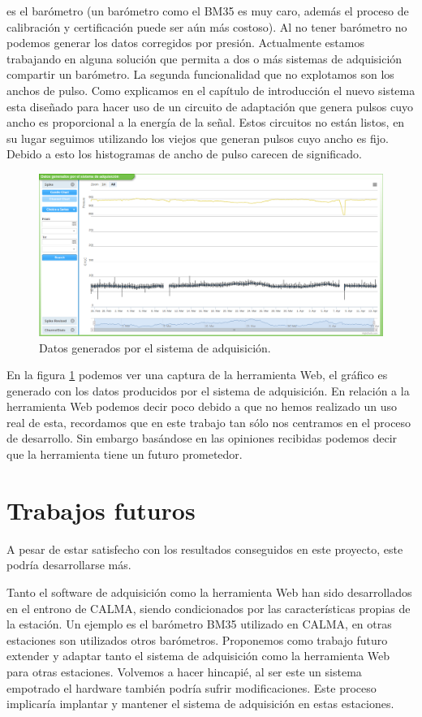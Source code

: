 	es el barómetro (un barómetro como el BM35 es muy caro, además el proceso de calibración y certificación puede ser aún más costoso). Al no
	tener barómetro no podemos generar los datos corregidos por presión. Actualmente estamos trabajando en alguna solución que permita a dos o más
	sistemas de adquisición compartir un barómetro. La segunda funcionalidad que no explotamos son los anchos de pulso. Como explicamos en el
	capítulo de introducción el nuevo sistema esta diseñado para hacer uso de un circuito de adaptación que genera pulsos cuyo ancho es
	proporcional a la energía de la señal. Estos circuitos no están listos, en su lugar seguimos utilizando los viejos que generan pulsos cuyo
	ancho es fijo. Debido a esto los histogramas de ancho de pulso carecen de significado. 
	\begin{figure}[h]
		\centering
		\includegraphics[keepaspectratio, width=1\textwidth]{./img/resultados.png}
		\caption{Datos generados por el sistema de adquisición.}   
		\label{fig:resultados}
	\end{figure}
	\par
	En la figura \ref{fig:resultados} podemos ver una captura de la herramienta Web, el gráfico es generado con los datos producidos por el
	sistema de adquisición. En relación a la herramienta Web podemos decir poco debido a que no hemos realizado un uso real de esta, recordamos
	que en este trabajo tan sólo nos centramos en el proceso de desarrollo. Sin embargo basándose en las opiniones recibidas podemos decir que la
	herramienta tiene un futuro prometedor.

\section{Trabajos futuros}
	A pesar de estar satisfecho con los resultados conseguidos en este proyecto, este podría desarrollarse más.
	\par
	Tanto el software de adquisición como la herramienta Web han sido desarrollados en el entrono de CALMA, siendo condicionados por las
	características propias de la estación. Un ejemplo es el barómetro BM35 utilizado en CALMA, en otras estaciones son utilizados otros
	barómetros. Proponemos como trabajo futuro extender y adaptar tanto el sistema de adquisición como la herramienta Web para otras estaciones.
	Volvemos a hacer hincapié, al ser este un sistema empotrado el hardware también podría sufrir modificaciones. Este proceso implicaría
	implantar y mantener el sistema de adquisición en estas estaciones.
